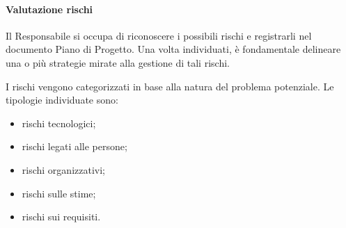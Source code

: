         \paragraph{Valutazione rischi}
        Il Responsabile si occupa di riconoscere i possibili rischi e registrarli nel documento Piano di Progetto. Una volta individuati, è fondamentale delineare una o più strategie mirate alla gestione di tali rischi.

        \vspace{0.3cm}
        \noindent
        I rischi vengono categorizzati in base alla natura del problema potenziale. Le tipologie individuate sono:
        \begin{itemize}
            \item rischi tecnologici;
            \item rischi legati alle persone;
            \item rischi organizzativi;
            \item rischi sulle stime;
            \item rischi sui requisiti.
        \end{itemize}

